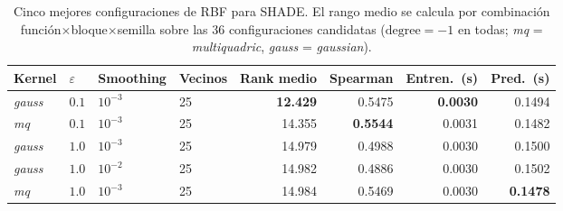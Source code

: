 \begin{table}[H]
    \centering
    \small
    \setlength{\tabcolsep}{4pt}
    \begin{adjustbox}{max width=\textwidth}
        \begin{tabular}{llll|rrrr}
            \toprule
            \textbf{Kernel} & \textbf{$\varepsilon$} & \textbf{Smoothing} & \textbf{Vecinos} & \textbf{Rank medio} & \textbf{Spearman} & \textbf{Entren.\ (s)} & \textbf{Pred.\ (s)} \\
            \midrule
            \textit{gauss} & $0.1$ & $10^{-3}$ & 25 & \textbf{12.429} & 0.5475 & \textbf{0.0030} & 0.1494 \\
            \textit{mq} & $0.1$ & $10^{-3}$ & 25 & 14.355 & \textbf{0.5544} & 0.0031 & 0.1482 \\
            \textit{gauss} & $1.0$ & $10^{-3}$ & 25 & 14.979 & 0.4988 & 0.0030 & 0.1500 \\
            \textit{gauss} & $1.0$ & $10^{-2}$ & 25 & 14.982 & 0.4886 & 0.0030 & 0.1502 \\
            \textit{mq} & $1.0$ & $10^{-3}$ & 25 & 14.984 & 0.5469 & 0.0030 & \textbf{0.1478} \\
            \bottomrule
        \end{tabular}
    \end{adjustbox}
    \caption[Cinco mejores configuraciones de RBF para SHADE según rango medio sobre Spearman interno.]{Cinco mejores configuraciones de RBF para SHADE. El rango medio se calcula por combinación función$\times$bloque$\times$semilla sobre las 36 configuraciones candidatas ($\text{degree}=-1$ en todas; \textit{mq} = \textit{multiquadric}, \textit{gauss} = \textit{gaussian}).}
    \label{tab:ajuste_interno_rbf_shade}
\end{table}
